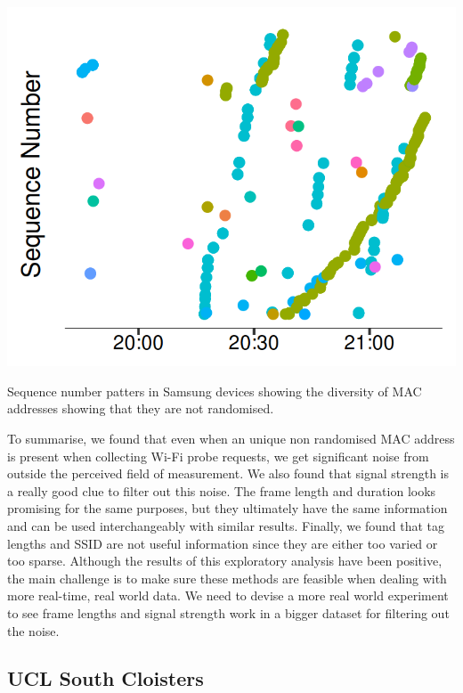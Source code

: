 \begin{marginfigure}
  \forcerectofloat
  \includegraphics{images/home-samsung-google.png}
  \caption{Sequence number patters in Samsung devices showing the diversity of MAC addresses showing that they are not randomised.}
  \label{figure:collection:home:samsung}
\end{marginfigure}

To summarise, we found that even when an unique non randomised MAC address is present when collecting Wi-Fi probe requests, we get significant noise from outside the perceived field of measurement.
We also found that signal strength is a really good clue to filter out this noise.
The frame length and duration looks promising for the same purposes, but they ultimately have the same information and can be used interchangeably with similar results.
Finally, we found that tag lengths and SSID are not useful information since they are either too varied or too sparse.
Although the results of this exploratory analysis have been positive, the main challenge is to make sure these methods are feasible when dealing with more real-time, real world data.
We need to devise a more real world experiment to see frame lengths and signal strength work in a bigger dataset for filtering out the noise. 

\subsection{UCL South Cloisters}

